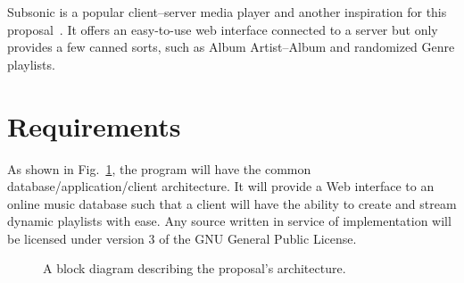 \documentclass{abrice}
\begin{document}
Subsonic is a popular client--server media player and another inspiration for
this proposal~\cite{subsonic}. It offers an easy-to-use web interface connected
to a server but only provides a few canned sorts, such as Album Artist--Album
and randomized Genre playlists.

\section{Requirements}

As shown in Fig.~\ref{fig:arch}, the program will have the common
database/application/client architecture. It will provide a Web interface to an
online music database such that a client will have the ability to create and
stream dynamic playlists with ease. Any source written in service of
implementation will be licensed under version 3 of the GNU General Public
License.

\begin{figure}
  \label{fig:arch}
  \centering
  \caption{A block diagram describing the proposal's architecture.}
\end{figure}
\end{document}
